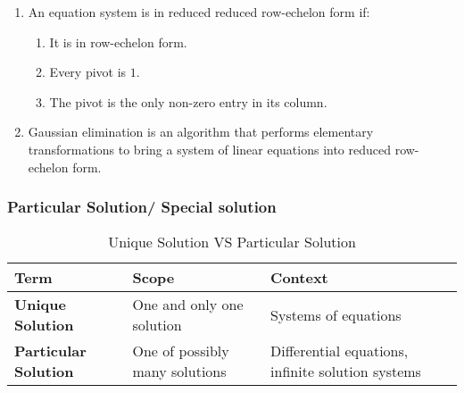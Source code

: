 \begin{enumerate}
    \item An equation system is in reduced reduced row-echelon form if:
    \begin{enumerate}
        \item It is in row-echelon form.
        \hfill \cite{mfml/book/mml/Deisenroth-Faisal-Ong}
    
        \item Every pivot is $1$.
        \hfill \cite{mfml/book/mml/Deisenroth-Faisal-Ong}
    
        \item The pivot is the only non-zero entry in its column.
        \hfill \cite{mfml/book/mml/Deisenroth-Faisal-Ong}
    \end{enumerate}

    \item Gaussian elimination is an algorithm that performs elementary transformations to bring a system of linear equations into reduced row-echelon form.
    \hfill \cite{mfml/book/mml/Deisenroth-Faisal-Ong}
\end{enumerate}










\subsubsection{Particular Solution/ Special solution}

\begin{customArrayStretch}{1.3}
\begin{table}[H]
    \centering
    \begin{tabular}{|l|l|l|}
        \hline
        \textbf{Term} & 
            \textbf{Scope} & 
            \textbf{Context} \\ \hline \hline
        
        \textbf{Unique Solution} & 
            One and only one solution & 
            Systems of equations \\ \hline

        \textbf{Particular Solution} & 
            One of possibly many solutions & 
            Differential equations, infinite solution systems \\ \hline

    \end{tabular}
    \caption*{Unique Solution VS Particular Solution \cite{common/online/chatgpt}}
\end{table}
\end{customArrayStretch}



